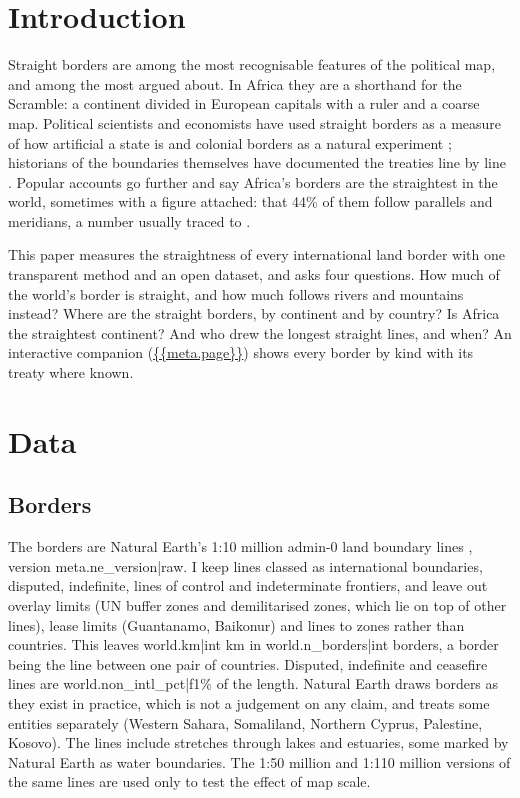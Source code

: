 \documentclass[11pt,a4paper]{article}
\begin{document}
\section{Introduction}
Straight borders are among the most recognisable features of the political map, and among the most argued about. In Africa they are a shorthand for the Scramble: a continent divided in European capitals with a ruler and a coarse map. Political scientists and economists have used straight borders as a measure of how artificial a state is \citep{alesina2011} and colonial borders as a natural experiment \citep{michalopoulos2016}; historians of the boundaries themselves have documented the treaties line by line \citep{brownlie1979,biger1995,prescott2008}. Popular accounts go further and say Africa's borders are the straightest in the world, sometimes with a figure attached: that 44\% of them follow parallels and meridians, a number usually traced to \citet{barbour1961}.

This paper measures the straightness of every international land border with one transparent method and an open dataset, and asks four questions. How much of the world's border is straight, and how much follows rivers and mountains instead? Where are the straight borders, by continent and by country? Is Africa the straightest continent? And who drew the longest straight lines, and when? An interactive companion (\url{{{meta.page}}}) shows every border by kind with its treaty where known.

\section{Data}
\subsection{Borders}
The borders are Natural Earth's 1:10 million admin-0 land boundary lines \citep{naturalearth}, version {{meta.ne_version|raw}}. I keep lines classed as international boundaries, disputed, indefinite, lines of control and indeterminate frontiers, and leave out overlay limits (UN buffer zones and demilitarised zones, which lie on top of other lines), lease limits (Guantanamo, Baikonur) and lines to zones rather than countries. This leaves {{world.km|int}} km in {{world.n_borders|int}} borders, a border being the line between one pair of countries. Disputed, indefinite and ceasefire lines are {{world.non_intl_pct|f1}}\% of the length. Natural Earth draws borders as they exist in practice, which is not a judgement on any claim, and treats some entities separately (Western Sahara, Somaliland, Northern Cyprus, Palestine, Kosovo). The lines include stretches through lakes and estuaries, some marked by Natural Earth as water boundaries. The 1:50 million and 1:110 million versions of the same lines are used only to test the effect of map scale.
\end{document}

